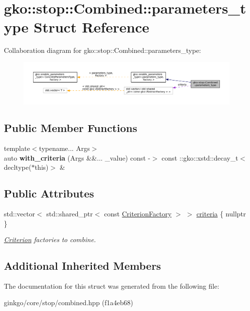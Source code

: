 \hypertarget{structgko_1_1stop_1_1Combined_1_1parameters__type}{}\section{gko\+:\+:stop\+:\+:Combined\+:\+:parameters\+\_\+type Struct Reference}
\label{structgko_1_1stop_1_1Combined_1_1parameters__type}


Collaboration diagram for gko\+:\+:stop\+:\+:Combined\+:\+:parameters\+\_\+type\+:
\nopagebreak
\begin{figure}[H]
\begin{center}
\leavevmode
\includegraphics[width=350pt]{structgko_1_1stop_1_1Combined_1_1parameters__type__coll__graph}
\end{center}
\end{figure}
\subsection*{Public Member Functions}
\begin{DoxyCompactItemize}
\item 
\mbox{\label{structgko_1_1stop_1_1Combined_1_1parameters__type_ae9e759fd53bb4bef3e8899a5bb462eec}} 
{\footnotesize template$<$typename... Args$>$ }\\auto {\bfseries with\+\_\+criteria} (Args \&\&... \+\_\+value) const -\/$>$ const \+::gko\+::xstd\+::decay\+\_\+t$<$ decltype($\ast$this)$>$ \&
\end{DoxyCompactItemize}
\subsection*{Public Attributes}
\begin{DoxyCompactItemize}
\item 
\mbox{\label{structgko_1_1stop_1_1Combined_1_1parameters__type_a2ab63880c1758c42b3a175cd6b004635}} 
std\+::vector$<$ std\+::shared\+\_\+ptr$<$ const \hyperlink{namespacegko_1_1stop_ab12a51109c50b35ec36dc5a393d6a9a0}{Criterion\+Factory} $>$ $>$ \hyperlink{structgko_1_1stop_1_1Combined_1_1parameters__type_a2ab63880c1758c42b3a175cd6b004635}{criteria} \{ nullptr \}
\begin{DoxyCompactList}\small\item\em \hyperlink{classgko_1_1stop_1_1Criterion}{Criterion} factories to combine. \end{DoxyCompactList}\end{DoxyCompactItemize}
\subsection*{Additional Inherited Members}


The documentation for this struct was generated from the following file\+:\begin{DoxyCompactItemize}
\item 
ginkgo/core/stop/combined.\+hpp (f1a4eb68)\end{DoxyCompactItemize}
